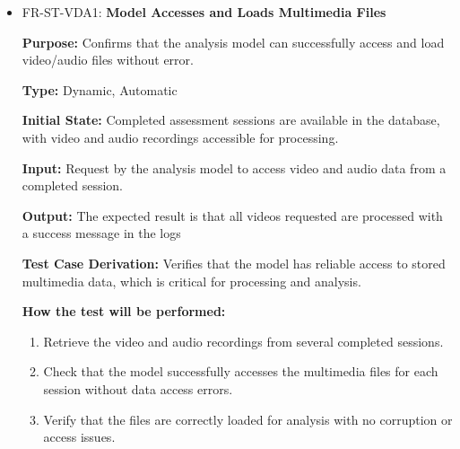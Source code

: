\documentclass[12pt, titlepage]{article}
\begin{document}
\begin{itemize}
  \item FR-ST-VDA1: \textbf{Model Accesses and Loads Multimedia Files}
  \begin{mdframed}[linewidth=0.5mm]
      \textbf{Purpose:} Confirms that the analysis model can successfully access and load video/audio files without error. \par
      \textbf{Type:} Dynamic, Automatic \par
      \textbf{Initial State:} Completed assessment sessions are available in the database, with video and audio recordings accessible for processing. \par
      \textbf{Input:} Request by the analysis model to access video and audio data from a completed session. \par
      \textbf{Output:} The expected result is that all videos requested are processed with a success message in the logs \par
      \textbf{Test Case Derivation:} Verifies that the model has reliable access to stored multimedia data, which is critical for processing and analysis. \par
      \textbf{How the test will be performed:}
      \begin{enumerate}[noitemsep]
        \item Retrieve the video and audio recordings from several completed sessions.
        \item Check that the model successfully accesses the multimedia files for each session without data access errors.
        \item Verify that the files are correctly loaded for analysis with no corruption or access issues.
      \end{enumerate}
  \end{mdframed}


\end{itemize}
\end{document}
